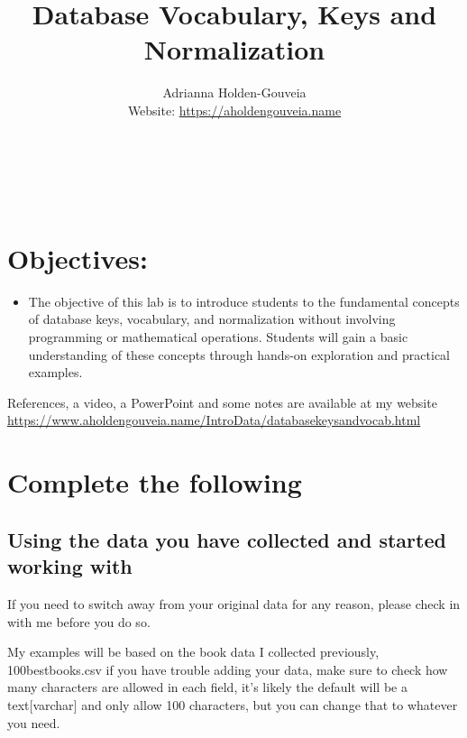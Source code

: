 \documentclass[12pt]{article}
\title{Database Vocabulary, Keys and Normalization}
\author{
        Adrianna Holden-Gouveia \\
        Website: \url{https://aholdengouveia.name}\\ 
        \date{\vspace{-5ex}}
        \faLinkedin{: aholdengouveia} \\
        \faGithub {: aholdengouveia} \\
        \faTwitter {: aholdengouveia} \\
        }
\begin{document}
    

\maketitle


\section*{Objectives:}
\begin{itemize}
    \item The objective of this lab is to introduce students to the fundamental concepts of database keys, vocabulary, and normalization without involving programming or mathematical operations. Students will gain a basic understanding of these concepts through hands-on exploration and practical examples.
\end{itemize}

References, a video, a PowerPoint and some notes are available at my website \url {https://www.aholdengouveia.name/IntroData/databasekeysandvocab.html}


\section*{Complete the following}


\subsection*{Using the data you have collected and started working with}

If you need to switch away from your original data for any reason, please check in with me before you do so. 

My examples will be based on the book data I collected previously, 100bestbooks.csv if you have trouble adding your data, make sure to check how many characters are allowed in each field, it's likely the default will be a text[varchar] and only allow 100 characters, but you can change that to whatever you need. 
\end{document}

